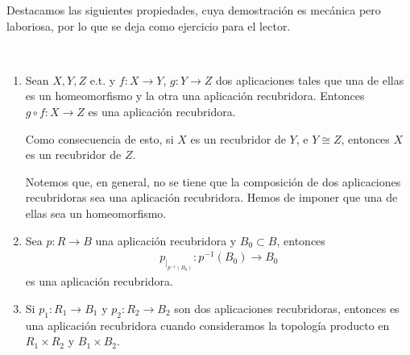 Destacamos las siguientes propiedades, cuya demostración es mecánica pero laboriosa, por lo que se deja como ejercicio para el lector.
\begin{propiedades}\ \label{propiedades:recubridora}
    \begin{enumerate}
        \item Sean $X,Y,Z$ e.t. y $f:X\to Y$, $g:Y\to Z$ dos aplicaciones tales que una de ellas es un homeomorfismo y la otra una aplicación recubridora. Entonces $g\circ f : X\to Z$ es una aplicación recubridora.
        
        Como consecuencia de esto, si $X$ es un recubridor de $Y$, e $Y\cong Z$, entonces $X$ es un recubridor de $Z$.
        
        Notemos que, en general, no se tiene que la composición de dos aplicaciones recubridoras sea una aplicación recubridora. Hemos de imponer que una de ellas sea un homeomorfismo.

        \item Sea $p:R\to B$ una aplicación recubridora y $B_0\subset B$, entonces
        \begin{align*}
            p_{|_{p^{-1}(B_0)}}:p^{-1}(B_0) \to B_0
        \end{align*}
        es una aplicación recubridora.

        \item Si $p_1:R_1\to B_1$ y $p_2:R_2\to B_2$ son dos aplicaciones recubridoras, entonces
        es una aplicación recubridora cuando consideramos la topología producto en $R_1\times R_2$ y $B_1\times B_2$. 
    \end{enumerate}
\end{propiedades}

